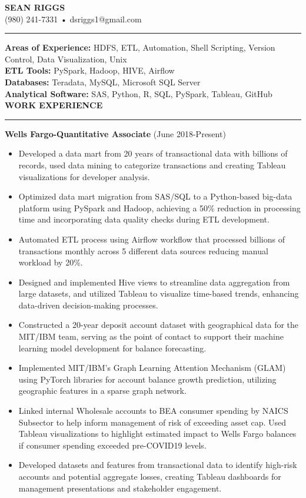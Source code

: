 \documentclass[a4paper,10pt]{article}
\begin{document}
\begin{center}
\textbf{\Large SEAN RIGGS}\\
(980) 241-7331 • dsriggs1@gmail.com\vspace{1mm}\\
\hrule height 2pt
\vspace{2mm}
\end{center}

\noindent
\textbf{Areas of Experience:}
HDFS,  ETL, Automation, Shell Scripting, Version Control, Data Visualization, Unix\\
\textbf{ETL Tools:} PySpark, Hadoop, HIVE, Airflow \\
\textbf{Databases:} Teradata, MySQL, Microsoft SQL Server\\
\textbf{Analytical Software:} SAS, Python, R, SQL, PySpark, Tableau, GitHub\\

\noindent
\textbf{WORK EXPERIENCE}\vspace{-3mm}\\
\hrule height 2pt
\vspace{2mm}
\textbf{Wells Fargo-Quantitative Associate} (June 2018-Present)
\begin{itemize}
  \item Developed a data mart from 20 years of transactional data with billions of records, used data mining to categorize transactions and creating Tableau visualizations for developer analysis.
  \item Optimized data mart migration from SAS/SQL to a Python-based big-data platform using PySpark and Hadoop, achieving a 50\% reduction in processing time and incorporating data quality checks during ETL development.
  \item Automated ETL process using Airflow workflow that processed billions of transactions monthly across 5 different data sources reducing manual workload by 20\%.
  \item Designed and implemented Hive views to streamline data aggregation from large datasets, and utilized Tableau to visualize time-based trends, enhancing data-driven decision-making processes.
  \item Constructed a 20-year deposit account dataset with geographical data for the MIT/IBM team, serving as the point of contact to support their machine learning model development for balance forecasting.
  \item Implemented MIT/IBM's Graph Learning Attention Mechanism (GLAM) using PyTorch libraries for account balance growth prediction, utilizing geographic features in a sparse graph network.
  \item Linked internal Wholesale accounts to BEA consumer spending by NAICS Subsector to help inform management of risk of exceeding asset cap. Used Tableau visualizations to highlight estimated impact to Wells Fargo balances if consumer spending exceeded pre-COVID19 levels.
  \item Developed datasets and features from transactional data to identify high-risk accounts and potential aggregate losses, creating Tableau dashboards for management presentations and stakeholder engagement.
\end{itemize}
\end{document}
